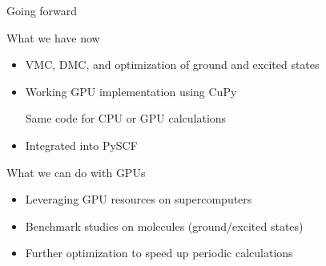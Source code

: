 \begin{frame}{Going forward}

\vspace{1em}

What we have now

\begin{itemize}[leftmargin=1em]
\item VMC, DMC, and optimization of ground and excited states
\item Working GPU implementation using CuPy

\quad Same code for CPU or GPU calculations
\item Integrated into PySCF
\end{itemize}

\vspace{1em}

What we can do with GPUs

\begin{itemize}[leftmargin=1em]
\item Leveraging GPU resources on supercomputers
\item Benchmark studies on molecules (ground/excited states)
\item Further optimization to speed up periodic calculations
\end{itemize}


\footnotesize{
}

\end{frame}
